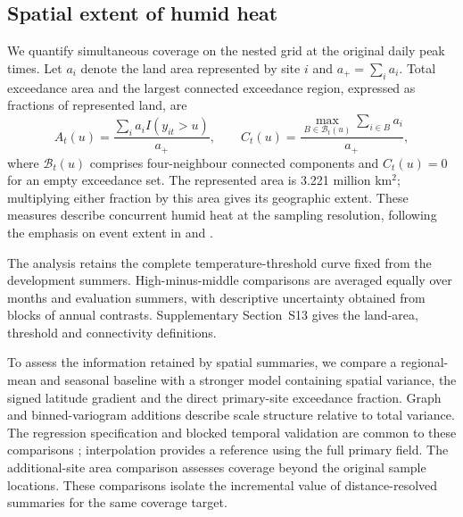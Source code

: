 \subsection{Spatial extent of humid heat}

We quantify simultaneous coverage on the nested grid at the original daily
peak times. Let $a_i$ denote the land area represented by site $i$ and
$a_+=\sum_i a_i$. Total exceedance area and the largest connected exceedance
region, expressed as fractions of represented land, are
\begin{equation}
 A_t(u)=\frac{\sum_i a_i I(y_{it}>u)}{a_+},\qquad
 C_t(u)=\frac{\max_{B\in\mathcal B_t(u)}\sum_{i\in B}a_i}{a_+},
 \label{eq:coverage}
\end{equation}
where $\mathcal B_t(u)$ comprises four-neighbour connected components and
$C_t(u)=0$ for an empty exceedance set. The represented area is 3.221 million
km$^2$; multiplying either fraction by this area gives its geographic extent.
These measures describe concurrent humid heat at the sampling resolution,
following the emphasis on event extent in \citet{healy2025} and
\citet{skinner2025}.

The analysis retains the complete temperature-threshold curve fixed from the
development summers. High-minus-middle comparisons are averaged equally over
months and evaluation summers, with descriptive uncertainty obtained from
blocks of annual contrasts. Supplementary Section~S13 gives the land-area,
threshold and connectivity definitions.

To assess the information retained by spatial summaries, we compare a
regional-mean and seasonal baseline with a stronger model containing spatial
variance, the signed latitude gradient and the direct primary-site
exceedance fraction. Graph and binned-variogram additions describe scale
structure relative to total variance. The regression specification and
blocked temporal validation are common to these comparisons
\citep{roberts2017}; interpolation provides a reference using the full primary
field. The additional-site area comparison assesses coverage beyond the
original sample locations. These comparisons isolate the incremental value
of distance-resolved summaries for the same coverage target.
